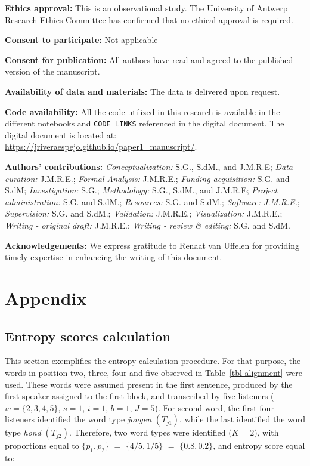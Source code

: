 \documentclass[
  authoryear,
  preprint,
  1p]{elsarticle}
\begin{document}
\textbf{Ethics approval:} This is an observational study. The University
of Antwerp Research Ethics Committee has confirmed that no ethical
approval is required.

\textbf{Consent to participate:} Not applicable

\textbf{Consent for publication:} All authors have read and agreed to
the published version of the manuscript.

\textbf{Availability of data and materials:} {The data is delivered upon
request.}

\textbf{Code availability:} {All the code utilized in this research is
available in the different notebooks and \texttt{CODE\ LINKS} referenced
in the digital document. The digital document is located at:}
\url{https://jriveraespejo.github.io/paper1_manuscript/}.

\textbf{Authors' contributions:} \emph{Conceptualization:} S.G., S.dM.,
and J.M.R.E; \emph{Data curation:} J.M.R.E.; \emph{Formal Analysis:}
J.M.R.E.; \emph{Funding acquisition:} S.G. and S.dM;
\emph{Investigation:} S.G.; \emph{Methodology:} S.G., S.dM., and
J.M.R.E; \emph{Project administration:} S.G. and S.dM.;
\emph{Resources:} S.G. and S.dM.; \emph{Software: J.M.R.E.};
\emph{Supervision:} S.G. and S.dM.; \emph{Validation:} J.M.R.E.;
\emph{Visualization:} J.M.R.E.; \emph{Writing - original draft:}
J.M.R.E.; \emph{Writing - review \& editing:} S.G. and S.dM.

{\textbf{Acknowledgements:} We express gratitude to Renaat van Uffelen
for providing timely expertise in enhancing the writing of this
document.}

\newpage{}

\section{Appendix}\label{sec-appendix}

\subsection{Entropy scores calculation}\label{sec-appA}

This section exemplifies the entropy calculation procedure. {For that
purpose, the words in position two, three, four and five observed in
Table~\ref{tbl-alignment} were used. These words were assumed present in
the first sentence, produced by the first speaker assigned to the first
block, and transcribed by five listeners (\(w=\{2,3,4,5\}\), \(s=1\),
\(i=1\), \(b=1\), \(J=5\)). For second word, the first four listeners
identified the word type \emph{jongen} \((T_{j1})\), while the last
identified the word type \emph{hond} \((T_{j2})\). Therefore, two word
types were identified (\(K=2\)), with proportions equal to
\(\{ p_{1}, p_{2} \}\) \(=\) \(\{ 4/5, 1/5 \}\) \(=\)
\(\{ 0.8, 0.2 \}\), and entropy score equal to:}
\end{document}
